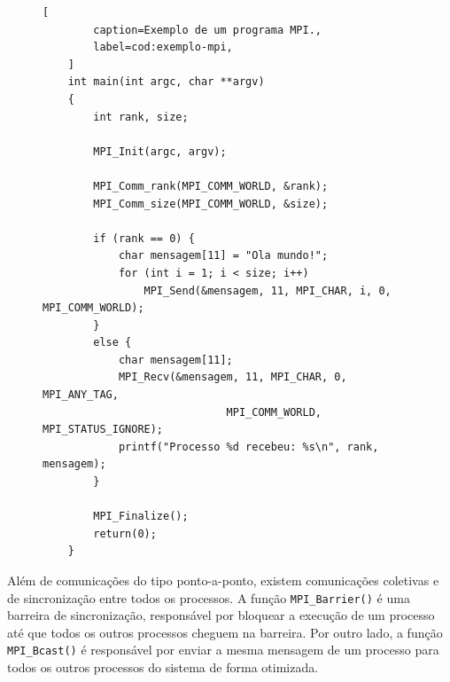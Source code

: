 \begin{figure}[t]
	\begin{lstlisting}[
		caption=Exemplo de um programa MPI.,
		label=cod:exemplo-mpi,
	]
	int main(int argc, char **argv)
	{
		int rank, size;

		MPI_Init(argc, argv);

		MPI_Comm_rank(MPI_COMM_WORLD, &rank);
		MPI_Comm_size(MPI_COMM_WORLD, &size);

		if (rank == 0) {
			char mensagem[11] = "Ola mundo!";
			for (int i = 1; i < size; i++)
				MPI_Send(&mensagem, 11, MPI_CHAR, i, 0, MPI_COMM_WORLD);
		}
		else {
			char mensagem[11];
			MPI_Recv(&mensagem, 11, MPI_CHAR, 0, MPI_ANY_TAG,
                             MPI_COMM_WORLD, MPI_STATUS_IGNORE);
			printf("Processo %d recebeu: %s\n", rank, mensagem);
		}

		MPI_Finalize();
		return(0);
	}
	\end{lstlisting}
\end{figure}

Além de comunicações do tipo ponto-a-ponto, existem comunicações coletivas e de sincronização entre
todos os processos. A função \texttt{MPI\_Barrier()} é uma barreira de sincronização, responsável por bloquear a
execução de um processo até que todos os outros processos cheguem na barreira.
Por outro lado, a função \texttt{MPI\_Bcast()} é responsável por enviar a mesma
mensagem de um processo para todos os outros processos do sistema de forma otimizada.

%
%
%
%
%
%


